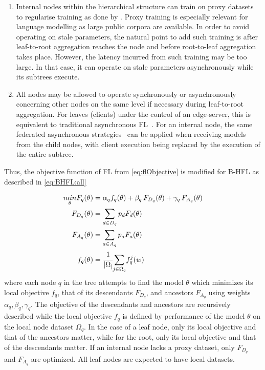 \begin{enumerate}
    \item Internal nodes within the hierarchical structure can train on proxy datasets to regularise training as done by \citet{OneShotFL,FLwithNonIID}. Proxy training is especially relevant for language modelling as large public corpora are available. In order to avoid operating on stale parameters, the natural point to add such training is after leaf-to-root aggregation reaches the node and before root-to-leaf aggregation takes place. However, the latency incurred from such training may be too large. In that case, it can operate on stale parameters asynchronously while its subtrees execute.
    \item All nodes may be allowed to operate synchronously or asynchronously concerning other nodes on the same level if necessary during leaf-to-root aggregation. For leaves (clients) under the control of an edge-server, this is equivalent to traditional asynchronous FL~\citep{AsynchronousFLonHetDevicesSurvey}. For an internal node, the same federated asynchronous strategies~\citep{FedBuff,PAPAYA} can be applied when receiving models from the child nodes, with client execution being replaced by the execution of the entire subtree.
\end{enumerate}

Thus, the objective function of FL from \cref{eq:flObjective} is modified for B-HFL as described in \cref{eq:BHFL:all}

\begin{subequations}
    \begin{align}
        \underset{\theta}{min} F_q(\theta) & = \alpha_q f_q(\theta) + \beta_q \, F_{D_q}(\theta) + \gamma_q \, F_{A_q}(\theta) \\
        F_{D_q}(\theta)                    & = \sum_{d \in D_q} p_d F_d(\theta)                                                \\
        F_{A_q}(\theta)                    & = \sum_{a \in A_q} p_a F_a(\theta)                                                \\
        f_q(\theta)                        & = \cfrac{1}{\lvert \Omega_ \rvert} \underset{j \in \Omega_q}{\sum} f_q^j(w)
    \end{align}
    \label{eq:BHFL:all}
\end{subequations}
where each node $q$ in the tree attempts to find the model $\theta$ which minimizes its local objective $f_q$, that of its descendants $F_{D_q}$, and ancestors $F_{A_q}$ using weights $\alpha_q,\beta_q,\gamma_q$. The objective of the descendants and ancestors are recursively described while the local objective $f_q$ is defined by performance of the model $\theta$ on the local node dataset $\Omega_q$. In the case of a leaf node, only its local objective and that of the ancestors matter, while for the root, only its local objective and that of the descendants matter. If an internal node lacks a proxy dataset, only $F_{D_q}$ and $F_{A_q}$ are optimized. All leaf nodes are expected to have local datasets.


